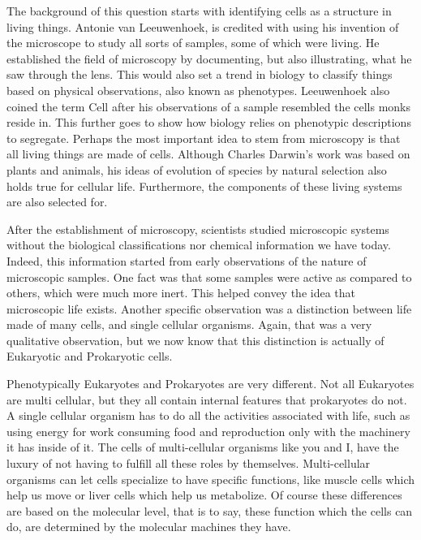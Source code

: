 \documentclass[a4paper,11pt,oneside]{book}
\begin{document}
The background of this question starts with identifying cells as a structure in living things. Antonie van Leeuwenhoek, is credited with using his invention of the microscope to study all sorts of samples, some of which were living. He established the field of microscopy by documenting, but also illustrating, what he saw through the lens. This would also set a trend in biology to classify things based on physical observations, also known as phenotypes. Leeuwenhoek also coined the term Cell after his observations of a sample resembled the cells monks reside in. This further goes to show how biology relies on phenotypic descriptions to segregate. Perhaps the most important idea to stem from microscopy is that all living things are made of cells. Although Charles Darwin's work was based on plants and animals, his ideas of evolution of species by natural selection also holds true for cellular life. Furthermore, the components of these living systems are also selected for.

After the establishment of microscopy, scientists studied microscopic systems without the biological classifications nor chemical information we have today. Indeed, this information started from early observations of the nature of microscopic samples. One fact was that some samples were active as compared to others, which were much more inert. This helped convey the idea that microscopic life exists. Another specific observation was a distinction between life made of many cells, and single cellular organisms. Again, that was a very qualitative observation, but we now know that this distinction is actually of Eukaryotic and Prokaryotic cells.

Phenotypically Eukaryotes and Prokaryotes are very different. Not all Eukaryotes are multi cellular, but they all contain internal features that prokaryotes do not. A single cellular organism has to do all the activities associated with life, such as using energy for work consuming food and reproduction only with the machinery it has inside of it. The cells of multi-cellular organisms like you and I, have the luxury of not having to fulfill all these roles by themselves. Multi-cellular organisms can let cells specialize to have specific functions, like muscle cells which help us move or liver cells which help us metabolize. Of course these differences are based on the molecular level, that is to say, these function which the cells can do, are determined by the molecular machines they have.
\end{document}

